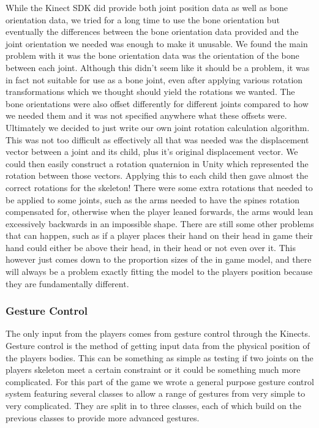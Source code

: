 \documentclass[a4paper,oneside]{memoir}
\begin{document}
				While the Kinect SDK did provide both joint position data as well as bone orientation data, we tried for a long time to use the bone orientation but eventually the differences between the bone orientation data provided and the joint orientation we needed was enough to make it unusable.
				We found the main problem with it was the bone orientation data was the orientation of the bone between each joint.
				Although this didn't seem like it should be a problem, it was in fact not suitable for use as a bone joint, even after applying various rotation transformations which we thought should yield the rotations we wanted.
				The bone orientations were also offset differently for different joints compared to how we needed them and it was not specified anywhere what these offsets were.
				Ultimately we decided to just write our own joint rotation calculation algorithm.
				This was not too difficult as effectively all that was needed was the displacement vector between a joint and its child, plus it's original displacement vector.
				We could then easily construct a rotation quaternion in Unity which represented the rotation between those vectors.
				Applying this to each child then gave almost the correct rotations for the skeleton!
				There were some extra rotations that needed to be applied to some joints, such as the arms needed to have the spines rotation compensated for, otherwise when the player leaned forwards, the arms would lean excessively backwards in an impossible shape.
				There are still some other problems that can happen, such as if a player places their hand on their head in game their hand could either be above their head, in their head or not even over it.
				This however just comes down to the proportion sizes of the in game model, and there will always be a problem exactly fitting the model to the players position because they are fundamentally different.

			\subsubsection{Gesture Control}

				The only input from the players comes from gesture control through the Kinects.
				Gesture control is the method of getting input data from the physical position of the players bodies.
				This can be something as simple as testing if two joints on the players skeleton meet a certain constraint or it could be something much more complicated.
				For this part of the game we wrote a general purpose gesture control system featuring several classes to allow a range of gestures from very simple to very complicated.
				They are split in to three classes, each of which build on the previous classes to provide more advanced gestures.
\end{document}

